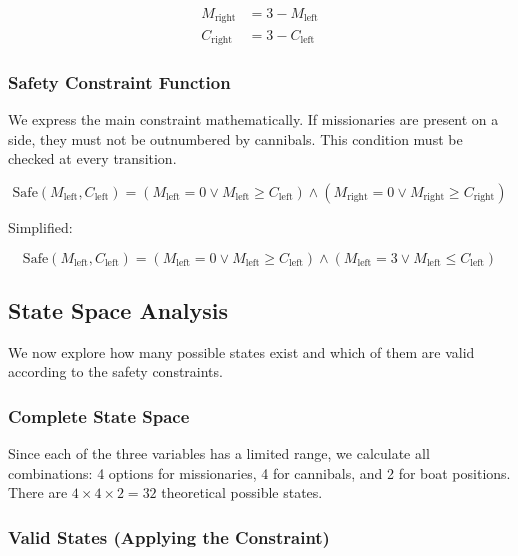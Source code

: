 \documentclass[10pt,a4paper]{article}
\begin{document}
\begin{align*}
    M_\text{right} &= 3 - M_\text{left} \\
    C_\text{right} &= 3 - C_\text{left}
\end{align*}

\subsubsection*{Safety Constraint Function}

We express the main constraint mathematically. If missionaries are present on a side, they must not be outnumbered by cannibals. This condition must be checked at every transition.

\begin{equation}
\text{Safe}(M_\text{left}, C_\text{left}) = (M_\text{left} = 0 \vee M_\text{left} \geq C_\text{left}) \wedge (M_\text{right} = 0 \vee M_\text{right} \geq C_\text{right})
\end{equation}

\noindent Simplified:

\begin{equation}
\text{Safe}(M_\text{left}, C_\text{left}) = (M_\text{left} = 0 \vee M_\text{left} \geq C_\text{left}) \wedge (M_\text{left} = 3 \vee M_\text{left} \leq C_\text{left})
\end{equation}

\subsection*{State Space Analysis}

\noindent We now explore how many possible states exist and which of them are valid according to the safety constraints.

\subsubsection*{Complete State Space}

Since each of the three variables has a limited range, we calculate all combinations: 4 options for missionaries, 4 for cannibals, and 2 for boat positions.\\

\noindent There are $4 \times 4 \times 2 = 32$ theoretical possible states.

\subsubsection*{Valid States (Applying the Constraint)}
\end{document}
